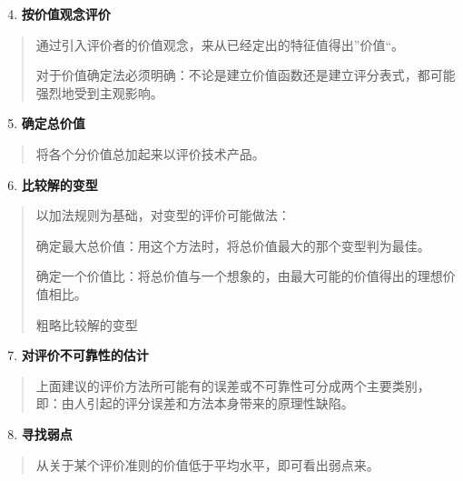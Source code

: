 \documentclass[letterpaper,10pt,english]{sphinxmanual}
\begin{document}
\begin{enumerate}
\setcounter{enumi}{3}
\item {} 
\textbf{按价值观念评价}

\end{enumerate}
\begin{quote}

通过引入评价者的价值观念，来从已经定出的特征值得出”价值“。

对于价值确定法必须明确：不论是建立价值函数还是建立评分表式，都可能强烈地受到主观影响。
\end{quote}
\begin{enumerate}
\setcounter{enumi}{4}
\item {} 
\textbf{确定总价值}

\end{enumerate}
\begin{quote}

将各个分价值总加起来以评价技术产品。
\end{quote}
\begin{enumerate}
\setcounter{enumi}{5}
\item {} 
\textbf{比较解的变型}

\end{enumerate}
\begin{quote}

以加法规则为基础，对变型的评价可能做法：

确定最大总价值：用这个方法时，将总价值最大的那个变型判为最佳。

确定一个价值比：将总价值与一个想象的，由最大可能的价值得出的理想价值相比。

粗略比较解的变型
\end{quote}
\begin{enumerate}
\setcounter{enumi}{6}
\item {} 
\textbf{对评价不可靠性的估计}

\end{enumerate}
\begin{quote}

上面建议的评价方法所可能有的误差或不可靠性可分成两个主要类别，
即：由人引起的评分误差和方法本身带来的原理性缺陷。
\end{quote}
\begin{enumerate}
\setcounter{enumi}{7}
\item {} 
\textbf{寻找弱点}

\end{enumerate}
\begin{quote}

从关于某个评价准则的价值低于平均水平，即可看出弱点来。
\end{quote}
\end{document}
